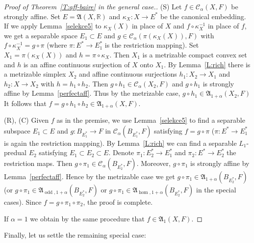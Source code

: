\documentclass{amsart}
\numberwithin{equation}{section}
\theoremstyle{definition}
\def\fra{\mathfrak{A}}
\def\C{\mathcal C}
\def\er{\mathbb R}
\def\hom{\operatorname{hom}}
\def\odd{\operatorname{odd}}
\begin{document}
\begin{proof}[Proof of Theorem~\ref{T:aff-baire} in the general case.]
(S) Let $f\in\C_\alpha(X,F)$ be strongly affine. Set $E=\fra(X,\er)$ and $\kappa_X:X\to E^*$ be the canonical embedding.
If we apply Lemma~\ref{selekce5} to $\kappa_X(X)$ in place of $X$ and $f\circ\kappa_X^{-1}$ in place of $f$, we get a separable
space $E_1\subset E$ and $g\in\C_\alpha(\pi(\kappa_X(X)),F)$ with $f\circ\kappa_X^{-1}=g\circ \pi$ (where $\pi:E^*\to E_1^*$ is the restriction mapping). Set $X_1=\pi(\kappa_X(X))$ and $h=\pi\circ\kappa_X$. Then $X_1$ is a metrizable compact convex set and $h$ is an affine continuous surjection of $X$ onto $X_1$. By Lemma~\ref{L:rich} there is a metrizable simplex $X_2$ and affine continuous surjections $h_1:X_2\to X_1$ and $h_2:X\to X_2$ with $h=h_1\circ h_2$. Then $g\circ h_1\in\C_\alpha(X_2,F)$ and $g\circ h_1$ is strongly affine by Lemma~\ref{perfectaff}. Thus by the metrizable case, $g\circ h_1\in \fra_{1+\alpha}(X_2,F)$ It follows that $f=g\circ h_1\circ h_2\in\fra_{1+\alpha}(X,F)$.


(R), (C) Given $f$ as in the premise, we use Lemma~\ref{selekce5} to find a separable subspace $E_1\subset E$ and $g\colon B_{E_1^*}\to F$ in $\C_\alpha(B_{E_1^*},F)$ satisfying $f=g\circ \pi$ ($\pi\colon {E^*}\to {E_1^*}$ is again the restriction mapping).
By Lemma~\ref{L:rich} we can find a separable $L_1$-predual $E_2$ satisfying $E_1\subset  E_2\subset E$. Denote $\pi_1:E_2^*\to E_1^*$ and $\pi_2:E^*\to E_2^*$ the restriction maps. Then $g\circ\pi_1\in\C_{\alpha}(B_{E_2^*},F)$. Moreover,  $g\circ\pi_1$ is strongly affine by Lemma~\ref{perfectaff}. Hence by the metrizable case we get $g\circ\pi_1\in\fra_{1+\alpha}(B_{E_2^*},F)$ (or $g\circ\pi_1\in\fra_{\odd,1+\alpha}(B_{E_2^*},F)$ or $g\circ\pi_1\in\fra_{\hom,1+\alpha}(B_{E_2^*},F)$
in the special cases). Since $f=g\circ\pi_1\circ\pi_2$, the proof is complete.

\smallskip

If $\alpha=1$ we obtain by the same procedure that $f\in\fra_1(X,F)$.
\end{proof}

Finally, let us settle the remaining special case:
\end{document}
